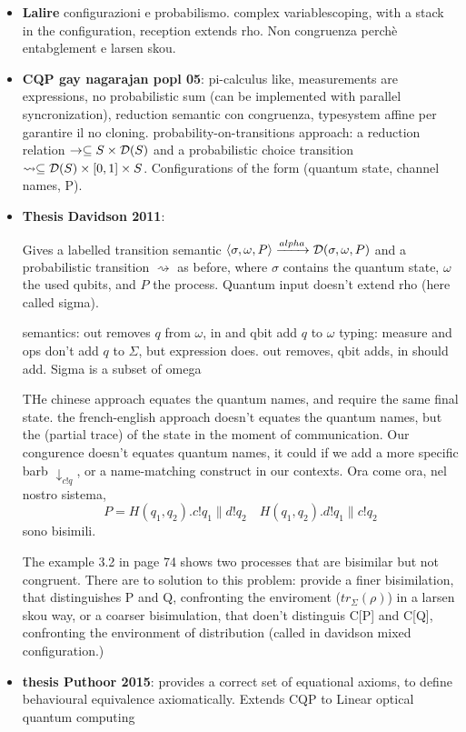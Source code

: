  


\begin{itemize}
\item \textbf{Lalire} configurazioni e probabilismo. complex variablescoping, with a stack in the configuration, reception extends rho. Non congruenza perchè entabglement e larsen skou.


\item \textbf{CQP gay nagarajan popl 05}: pi-calculus like, measurements are expressions, no probabilistic sum (can be implemented with parallel syncronization), reduction semantic con congruenza, typesystem affine per garantire il no cloning. probability-on-transitions approach: a reduction relation $\rightarrow \subseteq S \times \mathcal{D}(S)$ and a probabilistic choice transition $\rightsquigarrow \subseteq \mathcal{D}(S)\times [0, 1] \times S$. Configurations of the form (quantum state, channel names, P).

\item \textbf{Thesis Davidson 2011}:

Gives a labelled transition semantic $\langle \sigma, \omega, P\rangle \xrightarrow{alpha} \mathcal{D}(\sigma, \omega, P)$ and a probabilistic transition  $\rightsquigarrow$ as before, where $\sigma$ contains the quantum state, $\omega$ the used qubits, and $P$ the process. Quantum input doesn't extend rho (here called sigma).

semantics: out removes $q$ from $\omega$, in and qbit add $q$ to $\omega$ 
typing: measure and ops don't add $q$ to $\Sigma$, but expression does. out removes, qbit adds, in should add. 
Sigma is a subset of omega

THe chinese approach equates the quantum names, and require the same final state.
the french-english approach doesn't equates the quantum names, but the (partial trace) of the state in the moment of communication.
Our congurence doesn't equates quantum names, it could if we add a more specific barb $\downarrow_{c!q}$, or a name-matching construct in our contexts. 
Ora come ora, nel nostro sistema, 
\[ P = H(q_1, q_2).c!q_1 \parallel d!q_2 \quad H(q_1, q_2).d!q_1 \parallel c!q_2\]
sono bisimili.

The example 3.2 in page 74 shows two processes that are bisimilar but not congruent. There are to solution to this problem: provide a finer bisimilation, that distinguishes P and Q, confronting the enviroment ($tr_\Sigma(\rho)$) in a larsen skou way, or a coarser bisimulation, that doen't distinguis C[P] and C[Q], confronting the environment of distribution (called in davidson mixed configuration.)


\item \textbf{thesis Puthoor 2015}:
provides a correct set of equational axioms, to define behavioural equivalence axiomatically. Extends CQP to Linear optical quantum computing
\end{itemize}


